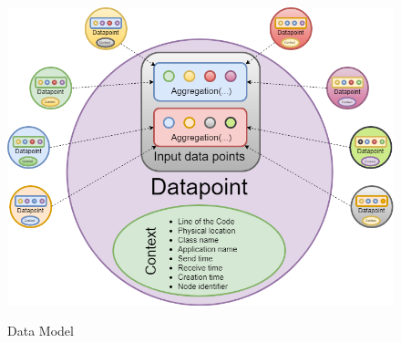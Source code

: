 \begin{itemize}
\begin{itemize}
	\end{itemize}
\begin{figure}[h]
\centering
\includegraphics[width=\linewidth]{figures/dataModelforIDP.png}\\
\caption{Data Model}
\label{dataModel}
\end{figure}
\end{itemize}